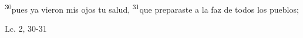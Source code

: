 \documentclass[../../rosario.tex]{subfiles}
\begin{document}
    \textsuperscript{30}pues ya vieron mis ojos tu salud, \textsuperscript{31}que preparaste a la faz de todos los pueblos;
    \begin{flushright}
    Lc. 2, 30-31         
    \end{flushright}
\end{document}
